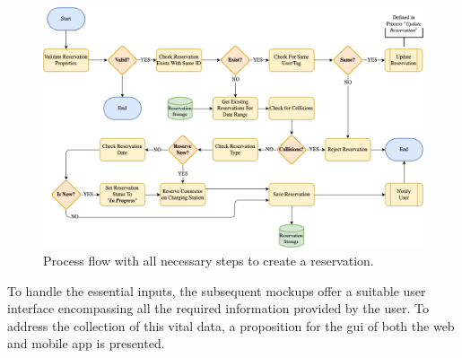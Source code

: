 \begin{figure}[h]
    \centering
    \includegraphics[scale=0.4]{resources/images/main/5_design/processes/ReservationCreate.png}
    \caption{Process flow with all necessary steps to create a reservation.}
    \label{fig:create-reservation-flowchart}
\end{figure}

\noindent To handle the essential inputs, the subsequent mockups offer a suitable user interface encompassing all the required information provided by the user. To address the collection of this vital data, a proposition for the \acrfull{gui} of both the web and mobile app is presented.

